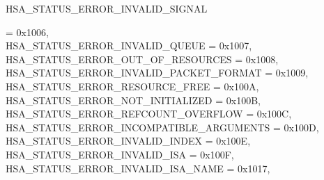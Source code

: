 \documentclass[final,oneside]{book}
\newcommand{\reftyp}[1]{#1}
\newcommand{\refenu}[1]{\reftyp{#1}}
\newenvironment{mylongtable}{\rowcolors{0}{lightgray}{lightgray}\longtable} {
\endlongtable}
\begin{document}
\begin{mylongtable}{@{}p{\textwidth}}
\hspace{1.7em}\hypertarget{group__status_1ggad755322e7ff95456520e8abdbe90d225a7b4c8c0d4c99a1fe966abc2d39b575fe}{\refenu{HSA_\-STATUS_\-ERROR_\-INVALID_\-SIGNAL}} = 0x1006,\\
\hspace{1.7em}\hypertarget{group__status_1ggad755322e7ff95456520e8abdbe90d225aa3c762eb6a61b358702b45259d1686c4}{\refenu{HSA_\-STATUS_\-ERROR_\-INVALID_\-QUEUE}} = 0x1007,\\
\hspace{1.7em}\hypertarget{group__status_1ggad755322e7ff95456520e8abdbe90d225a1a77fcf36d0d140874c4361ab093eff7}{\refenu{HSA_\-STATUS_\-ERROR_\-OUT_\-OF_\-RESOURCES}} = 0x1008,\\
\hspace{1.7em}\hypertarget{group__status_1ggad755322e7ff95456520e8abdbe90d225a3fad45f72111eb99de5d8daef26c372c}{\refenu{HSA_\-STATUS_\-ERROR_\-INVALID_\-PACKET_\-FORMAT}} = 0x1009,\\
\hspace{1.7em}\hypertarget{group__status_1ggad755322e7ff95456520e8abdbe90d225a6406af88203fcbec4179fbb71cc66b65}{\refenu{HSA_\-STATUS_\-ERROR_\-RESOURCE_\-FREE}} = 0x100A,\\
\hspace{1.7em}\hypertarget{group__status_1ggad755322e7ff95456520e8abdbe90d225a34ea59ade5bfce95eee935238a99f5b5}{\refenu{HSA_\-STATUS_\-ERROR_\-NOT_\-INITIALIZED}} = 0x100B,\\
\hspace{1.7em}\hypertarget{group__status_1ggad755322e7ff95456520e8abdbe90d225aa9218eed04d1d2ffc5ed8f33f2cd1c9b}{\refenu{HSA_\-STATUS_\-ERROR_\-REFCOUNT_\-OVERFLOW}} = 0x100C,\\
\hspace{1.7em}\hypertarget{group__status_1ggad755322e7ff95456520e8abdbe90d225a896bcafdb5c10c5802cf70083c3aeb8a}{\refenu{HSA_\-STATUS_\-ERROR_\-INCOMPATIBLE_\-ARGUMENTS}} = 0x100D,\\
\hspace{1.7em}\hypertarget{group__status_1ggad755322e7ff95456520e8abdbe90d225a810d9e6e3fa9db4478f270e60aa963dc}{\refenu{HSA_\-STATUS_\-ERROR_\-INVALID_\-INDEX}} = 0x100E,\\
\hspace{1.7em}\hypertarget{group__status_1ggad755322e7ff95456520e8abdbe90d225a6907a990eee322a97285e3656b846120}{\refenu{HSA_\-STATUS_\-ERROR_\-INVALID_\-ISA}} = 0x100F,\\
\hspace{1.7em}\hypertarget{group__status_1ggad755322e7ff95456520e8abdbe90d225a4328de4769aea88e55e84a3e16ac3ed8}{\refenu{HSA_\-STATUS_\-ERROR_\-INVALID_\-ISA_\-NAME}} = 0x1017,\\

\end{mylongtable}
\end{document}
